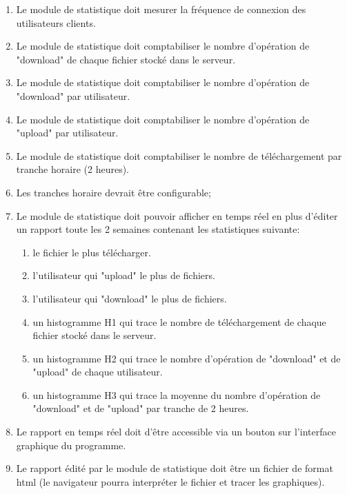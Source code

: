 \documentclass[10pt,a4paper]{report}
\begin{document}
		\begin{enumerate}
			\item Le module de statistique doit mesurer la fréquence de connexion des utilisateurs clients.

			\item Le module de statistique doit comptabiliser le nombre d'opération de "download" de chaque fichier stocké dans le serveur.

			\item Le module de statistique doit comptabiliser le nombre d'opération de "download" par utilisateur.

			\item Le module de statistique doit comptabiliser le nombre d'opération de "upload" par utilisateur.

			\item Le module de statistique doit comptabiliser le nombre de téléchargement par tranche horaire (2 heures).

			\item Les tranches horaire devrait être configurable;

			\item Le module de statistique doit pouvoir afficher en temps réel en plus d'éditer un rapport toute les 2 semaines contenant les statistiques suivante:

			\begin{enumerate}
				\item le fichier le plus télécharger.

				\item l'utilisateur qui "upload" le plus de fichiers.

				\item l'utilisateur qui "download" le plus de fichiers.

				\item un histogramme H1 qui trace le nombre de téléchargement de chaque fichier stocké dans le serveur.

				\item un histogramme H2 qui trace le nombre d'opération de "download" et de "upload" de chaque utilisateur.

				\item un histogramme H3 qui trace la moyenne du nombre d'opération de "download" et de "upload" par tranche de 2 heures.
			\end{enumerate}

			\item Le rapport en temps réel doit d'être accessible via un bouton sur l'interface graphique du programme.

			\item Le rapport édité par le module de statistique doit être un fichier de format html (le navigateur pourra interpréter le fichier et tracer les graphiques).
		\end{enumerate}
	
\end{document}
